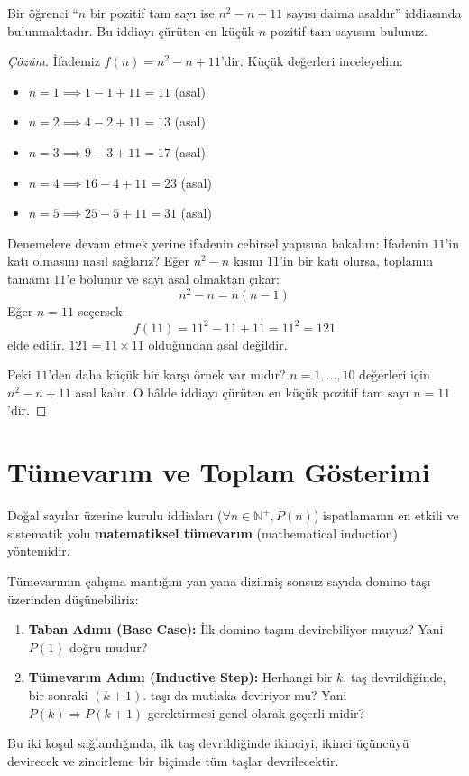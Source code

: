 \begin{example}
Bir öğrenci ``$n$ bir pozitif tam sayı ise $n^2 - n + 11$ sayısı daima asaldır'' iddiasında bulunmaktadır. Bu iddiayı çürüten en küçük $n$ pozitif tam sayısını bulunuz.
\end{example}
\begin{proof}[Çözüm]
İfademiz $f(n) = n^2 - n + 11$'dir.
Küçük değerleri inceleyelim:
\begin{itemize}
  \item $n=1 \implies 1 - 1 + 11 = 11$ (asal)
  \item $n=2 \implies 4 - 2 + 11 = 13$ (asal)
  \item $n=3 \implies 9 - 3 + 11 = 17$ (asal)
  \item $n=4 \implies 16 - 4 + 11 = 23$ (asal)
  \item $n=5 \implies 25 - 5 + 11 = 31$ (asal)
\end{itemize}
Denemelere devam etmek yerine ifadenin cebirsel yapısına bakalım: İfadenin $11$'in katı olmasını nasıl sağlarız? Eğer $n^2 - n$ kısmı $11$'in bir katı olursa, toplamın tamamı $11$'e bölünür ve sayı asal olmaktan çıkar:
\[ n^2 - n = n(n - 1) \]
Eğer $n = 11$ seçersek:
\[ f(11) = 11^2 - 11 + 11 = 11^2 = 121 \]
elde edilir. $121 = 11 \times 11$ olduğundan asal değildir. 

Peki $11$'den daha küçük bir karşı örnek var mıdır? $n=1, \dots, 10$ değerleri için $n^2 - n + 11$ asal kalır. O hâlde iddiayı çürüten en küçük pozitif tam sayı $n = 11$'dir.
\end{proof}


\section{Tümevarım ve Toplam Gösterimi}

Doğal sayılar üzerine kurulu iddiaları ($\forall n \in \mathbb{N}^+, P(n)$) ispatlamanın en etkili ve sistematik yolu \textbf{matematiksel tümevarım} (mathematical induction) yöntemidir.

Tümevarımın çalışma mantığını yan yana dizilmiş sonsuz sayıda domino taşı üzerinden düşünebiliriz:
\begin{enumerate}
  \item \textbf{Taban Adımı (Base Case):} İlk domino taşını devirebiliyor muyuz? Yani $P(1)$ doğru mudur?
  \item \textbf{Tümevarım Adımı (Inductive Step):} Herhangi bir $k$. taş devrildiğinde, bir sonraki $(k+1)$. taşı da mutlaka deviriyor mu? Yani $P(k) \Rightarrow P(k+1)$ gerektirmesi genel olarak geçerli midir?
\end{enumerate}
Bu iki koşul sağlandığında, ilk taş devrildiğinde ikinciyi, ikinci üçüncüyü devirecek ve zincirleme bir biçimde tüm taşlar devrilecektir.

